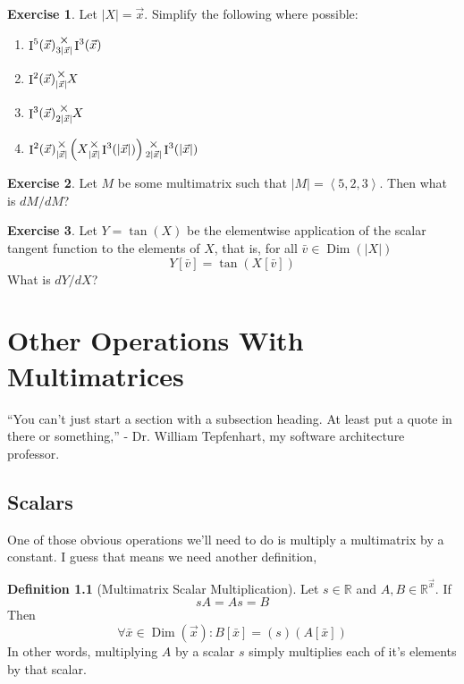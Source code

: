 \documentclass[12pt]{book}
\theoremstyle{plain}
\theoremstyle{definition}
\newtheorem{definition}{Definition}[chapter]
\newtheorem{exercise}{Exercise}[chapter]
\theoremstyle{ppart}
\theoremstyle{case}
\theoremstyle{solution}
\DeclareMathOperator{\Dim}{Dim}
\DeclareMathOperator{\Ident}{I}
\newcommand{\mmult}[1]{\text{\raisebox{1ex}{$\underset{#1}{\times}$}}}
\newcommand{\shape}[1]{\left|#1\right|}
\begin{document}
\begin{exercise}
Let $\shape{X} = \vec{x}$. Simplify the following where possible:
\begin{enumerate}
\item $\Ident^5(\vec{x}) \mmult{3 \shape{\vec{x}}} \Ident^3(\vec{x})$
\item $\Ident^2(\vec{x}) \mmult{\shape{\vec{x}}} X$
\item $\Ident^3(\vec{x}) \mmult{2\shape{\vec{x}}} X$
\item $\Ident^2(\vec{x}) \mmult{\shape{\vec{x}}} \left(X \mmult{\shape{\vec{x}}} \Ident^3(\shape{\vec{x}})
				\right) \mmult{2\shape{\vec{x}}} \Ident^3(\shape{\vec{x}})$
\end{enumerate}
\end{exercise}

\begin{exercise}
Let $M$ be some multimatrix such that $\shape{M} = \left<5,2,3\right>$. Then what is
$dM/dM$?
\end{exercise}

\begin{exercise}
Let $Y = \tan(X)$ be the elementwise application of the scalar tangent function to
the elements of $X$, that is, for all $\bar{v} \in \Dim(\shape{X})$
\[ Y[\bar{v}] = \tan(X[\bar{v}]) \]
What is $dY/dX$?
\end{exercise}

\chapter{Other Operations With Multimatrices}

\begin{displayquote}
``You can't just start a section with a subsection heading. At least put a quote
in there or something,'' - Dr. William Tepfenhart, my software architecture professor.
\end{displayquote}

\section{Scalars}

One of those obvious operations we'll need to do is multiply
a multimatrix by a constant. I guess that means we need another definition,

\begin{definition}[Multimatrix Scalar Multiplication]
Let $s \in \mathbb{R}$ and $A, B \in \mathbb{R}^{\vec{x}}$. If
\[ sA = As = B \]
Then
\[ \forall \bar{x} \in \Dim(\vec{x}):
   B[\bar{x}] = (s)(A[\bar{x}]) \]
In other words, multiplying $A$ by a scalar $s$ simply multiplies each of
it's elements by that scalar.
\end{definition}
\end{document}
